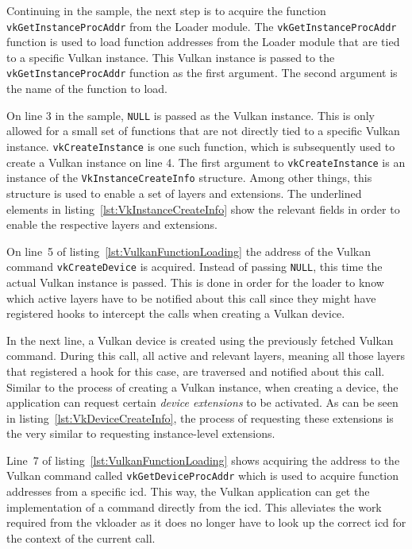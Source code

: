       Continuing in the sample, the next step is to acquire the function \lstinline{vkGetInstanceProcAddr} from the Loader module.
      The \lstinline{vkGetInstanceProcAddr} function is used to load function addresses from the Loader module that are tied to a specific Vulkan instance.
      This Vulkan instance is passed to the \lstinline{vkGetInstanceProcAddr} function as the first argument.
      The second argument is the name of the function to load.

      On line 3 in the sample, \lstinline{NULL} is passed as the Vulkan instance.
      This is only allowed for a small set of functions that are not directly tied to a specific Vulkan instance.
      \lstinline{vkCreateInstance} is one such function, which is subsequently used to create a Vulkan instance on line 4.
      The first argument to \lstinline{vkCreateInstance} is an instance of the \lstinline{VkInstanceCreateInfo} structure.
      Among other things, this structure is used to enable a set of layers and extensions.
      The underlined elements in listing~\ref{lst:VkInstanceCreateInfo} show the relevant fields in order to enable the respective layers and extensions.

      On line~5 of listing~\ref{lst:VulkanFunctionLoading} the address of the Vulkan command \lstinline{vkCreateDevice} is acquired.
      Instead of passing \lstinline{NULL}, this time the actual Vulkan instance is passed.
      This is done in order for the loader to know which active layers have to be notified about this call since they might have registered hooks to intercept the calls when creating a Vulkan device.

      In the next line, a Vulkan device is created using the previously fetched Vulkan command.
      During this call, all active and relevant layers, meaning all those layers that registered a hook for this case, are traversed and notified about this call.
      Similar to the process of creating a Vulkan instance, when creating a device, the application can request certain \textit{device extensions} to be activated.
      As can be seen in listing~\ref{lst:VkDeviceCreateInfo}, the process of requesting these extensions is the very similar to requesting instance-level extensions.

      Line~7 of listing~\ref{lst:VulkanFunctionLoading} shows acquiring the address to the Vulkan command called \lstinline{vkGetDeviceProcAddr} which is used to acquire function addresses from a specific \gls{icd}.
      This way, the Vulkan application can get the implementation of a command directly from the \gls{icd}.
      This alleviates the work required from the \gls{vkloader} as it does no longer have to look up the correct \gls{icd} for the context of the current call.

